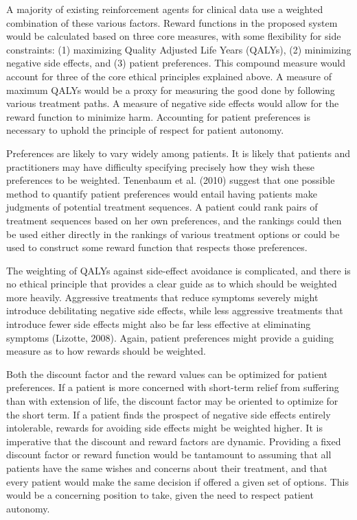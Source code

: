 \documentclass[]{spie}  %
\begin{document}
A majority of existing reinforcement agents for clinical data use a weighted combination of these various factors. Reward functions in the proposed system would be calculated based on three core measures, with some flexibility for side constraints: (1) maximizing Quality Adjusted Life Years (QALYs), (2) minimizing negative side effects, and (3) patient preferences. This compound measure would account for three of the core ethical principles explained above. A measure of maximum QALYs would be a proxy for measuring the good done by following various treatment paths. A measure of negative side effects would allow for the reward function to minimize harm. Accounting for patient preferences is necessary to uphold the principle of respect for patient autonomy.

Preferences are likely to vary widely among patients. It is likely that patients and practitioners may have difficulty specifying precisely how they wish these preferences to be weighted. Tenenbaum et al. (2010) suggest that one possible method to quantify patient preferences would entail having patients make judgments of potential treatment sequences. A patient could rank pairs of treatment sequences based on her own preferences, and the rankings could then be used either directly in the rankings of various treatment options or could be used to construct some reward function that respects those preferences.

The weighting of QALYs against side-effect avoidance is complicated, and there is no ethical principle that provides a clear guide as to which should be weighted more heavily. Aggressive treatments that reduce symptoms severely might introduce debilitating negative side effects, while less aggressive treatments that introduce fewer side effects might also be far less effective at eliminating symptoms (Lizotte, 2008). Again, patient preferences might provide a guiding measure as to how rewards should be weighted.

Both the discount factor and the reward values can be optimized for patient preferences. If a patient is more concerned with short-term relief from suffering than with extension of life, the discount factor may be oriented to optimize for the short term. If a patient finds the prospect of negative side effects entirely intolerable, rewards for avoiding side effects might be weighted higher. It is imperative that the discount and reward factors are dynamic. Providing a fixed discount factor or reward function would be tantamount to assuming that all patients have the same wishes and concerns about their treatment, and that every patient would make the same decision if offered a given set of options. This would be a concerning position to take, given the need to respect patient autonomy.
\end{document}
